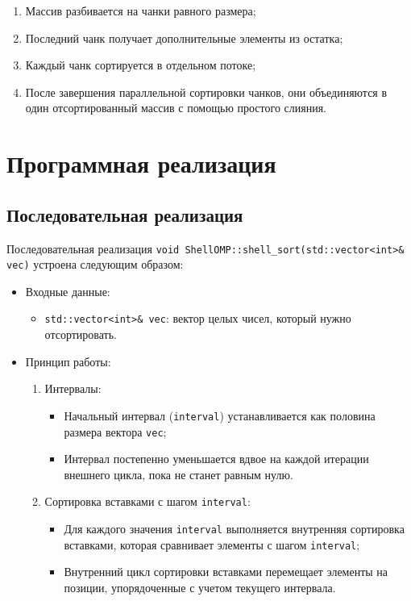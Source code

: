 \documentclass[]{article}
\theoremstyle{remark}
\theoremstyle{definition}
\newcommand{\cpp}[1]{\texttt{#1}}
\begin{document}
\begin{enumerate}
    \item Массив разбивается на чанки равного размера;
    \item Последний чанк получает дополнительные элементы из остатка;
    \item Каждый чанк сортируется в отдельном потоке;
    \item После завершения параллельной сортировки чанков, они объединяются в один отсортированный массив с помощью простого слияния.
\end{enumerate}

\newpage

\section{Программная реализация}

\subsection{Последовательная реализация}

\par Последовательная реализация \cpp{void ShellOMP::shell_sort(std::vector<int>& vec)} устроена следующим образом:

\begin{itemize}
    \item Входные данные:

    \begin{itemize}
        \item \cpp{std::vector<int>& vec}: вектор целых чисел, который нужно отсортировать.
    \end{itemize}
    
    \item Принцип работы:
    \begin{enumerate}
        \item Интервалы:
        \begin{itemize}
            \item Начальный интервал (\cpp{interval}) устанавливается как половина размера вектора \cpp{vec};
            \item Интервал постепенно уменьшается вдвое на каждой итерации внешнего цикла, пока не станет равным нулю.
        \end{itemize}
        \item Сортировка вставками с шагом \cpp{interval}:
        \begin{itemize}
            \item Для каждого значения \cpp{interval} выполняется внутренняя сортировка вставками, которая сравнивает элементы с шагом \cpp{interval};
            \item Внутренний цикл сортировки вставками перемещает элементы на позиции, упорядоченные с учетом текущего интервала.
        \end{itemize}
    \end{enumerate}
\end{itemize}
\end{document}
